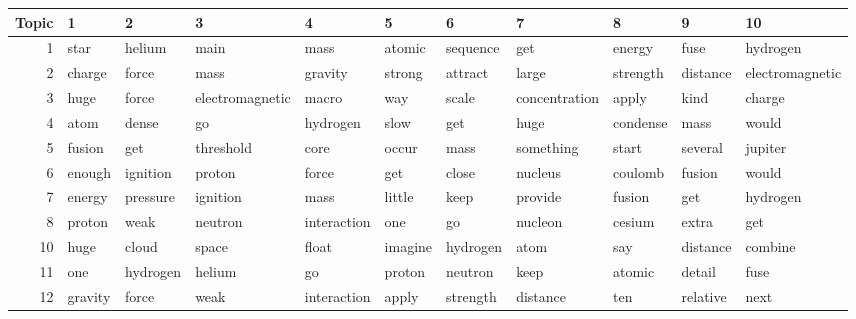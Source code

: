\documentclass[10pt]{article}
\begin{document}
\begin{table}[tp]
    \centering
    \begin{tiny}
    \begin{tabular}{|r|l|l|l|l|l|l|l|l|l|l|}
    \hline
    \textbf{Topic} & \textbf{1} & \textbf{2} &      \textbf{3} &  \textbf{4} & \textbf{5} & \textbf{6} &    \textbf{7} &  \textbf{8} & \textbf{9} &     \textbf{10} \\\hline
             1 &       star &     helium &            main &        mass &     atomic &   sequence &           get &      energy &       fuse &        hydrogen \\\hline
             2 &     charge &      force &            mass &     gravity &     strong &    attract &         large &    strength &   distance & electromagnetic \\\hline
             3 &       huge &      force & electromagnetic &       macro &        way &      scale & concentration &       apply &       kind &          charge \\\hline
             4 &       atom &      dense &              go &    hydrogen &       slow &        get &          huge &    condense &       mass &           would \\\hline
             5 &     fusion &        get &       threshold &        core &      occur &       mass &     something &       start &    several &         jupiter \\\hline
             6 &     enough &   ignition &          proton &       force &        get &      close &       nucleus &     coulomb &     fusion &           would \\\hline
             7 &     energy &   pressure &        ignition &        mass &     little &       keep &       provide &      fusion &        get &        hydrogen \\\hline
             8 &     proton &       weak &         neutron & interaction &        one &         go &       nucleon &      cesium &      extra &             get \\\hline
            10 &       huge &      cloud &           space &       float &    imagine &   hydrogen &          atom &         say &   distance &         combine \\\hline
            11 &        one &   hydrogen &          helium &          go &     proton &    neutron &          keep &      atomic &     detail &            fuse \\\hline
            12 &    gravity &      force &            weak & interaction &      apply &   strength &      distance &         ten &   relative &            next \\\hline

\end{tabular}
\end{tiny}
\end{table}
\end{document}
